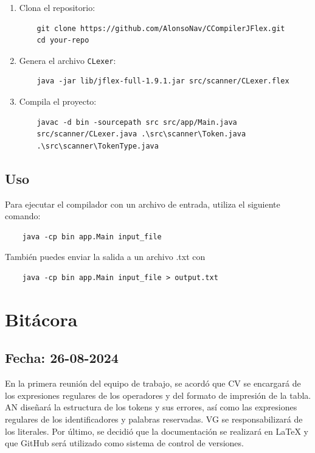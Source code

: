 \documentclass[a4paper,12pt]{article}
\begin{document}
\begin{enumerate}
    \item Clona el repositorio:
    \begin{verbatim}
    git clone https://github.com/AlonsoNav/CCompilerJFlex.git
    cd your-repo
    \end{verbatim}

    \item Genera el archivo \texttt{CLexer}:
    \begin{verbatim}
    java -jar lib/jflex-full-1.9.1.jar src/scanner/CLexer.flex
    \end{verbatim}

    \item Compila el proyecto:
    \begin{verbatim}
    javac -d bin -sourcepath src src/app/Main.java 
    src/scanner/CLexer.java .\src\scanner\Token.java 
    .\src\scanner\TokenType.java 
    \end{verbatim}
\end{enumerate}

\subsection*{Uso}
Para ejecutar el compilador con un archivo de entrada, utiliza el siguiente comando:
\begin{verbatim}
    java -cp bin app.Main input_file
\end{verbatim}
También puedes enviar la salida a un archivo .txt con
\begin{verbatim}
    java -cp bin app.Main input_file > output.txt
\end{verbatim}

\section*{Bitácora}

\subsection*{Fecha: 26-08-2024}
\begin{flushleft}
    \hspace*{2em} En la primera reunión del equipo de trabajo,
    se acordó que CV se encargará de los expresiones regulares
    de los operadores y del formato de impresión de la tabla.
    AN diseñará la estructura de los tokens y sus errores, 
    así como las expresiones regulares de los identificadores
    y palabras reservadas. VG se responsabilizará de los 
    literales. Por último, se decidió que la documentación se 
    realizará en LaTeX y que GitHub será utilizado como 
    sistema de control de versiones.
\end{flushleft}
\end{document}
